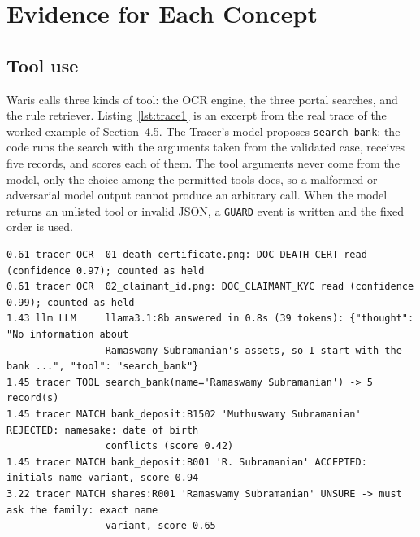 \section{Evidence for Each Concept}

\subsection{Tool use}
Waris calls three kinds of tool: the OCR engine, the three portal searches, and the rule retriever. Listing~\ref{lst:trace1} is an excerpt from the real trace of the worked example of Section~4.5. The Tracer's model proposes \texttt{search\_bank}; the code runs the search with the arguments taken from the validated case, receives five records, and scores each of them. The tool arguments never come from the model, only the choice among the permitted tools does, so a malformed or adversarial model output cannot produce an arbitrary call. When the model returns an unlisted tool or invalid JSON, a \texttt{GUARD} event is written and the fixed order is used.

\begin{lstlisting}[caption={Excerpt of the trace of the worked example: OCR, a model-chosen tool call and identity scoring (timestamps in seconds; long lines shortened).},label={lst:trace1},numbers=none,basicstyle=\ttfamily\scriptsize\setstretch{1.0}]
0.61 tracer OCR  01_death_certificate.png: DOC_DEATH_CERT read (confidence 0.97); counted as held
0.61 tracer OCR  02_claimant_id.png: DOC_CLAIMANT_KYC read (confidence 0.99); counted as held
1.43 llm LLM     llama3.1:8b answered in 0.8s (39 tokens): {"thought": "No information about
                 Ramaswamy Subramanian's assets, so I start with the bank ...", "tool": "search_bank"}
1.45 tracer TOOL search_bank(name='Ramaswamy Subramanian') -> 5 record(s)
1.45 tracer MATCH bank_deposit:B1502 'Muthuswamy Subramanian' REJECTED: namesake: date of birth
                 conflicts (score 0.42)
1.45 tracer MATCH bank_deposit:B001 'R. Subramanian' ACCEPTED: initials name variant, score 0.94
3.22 tracer MATCH shares:R001 'Ramaswamy Subramanian' UNSURE -> must ask the family: exact name
                 variant, score 0.65
\end{lstlisting}

